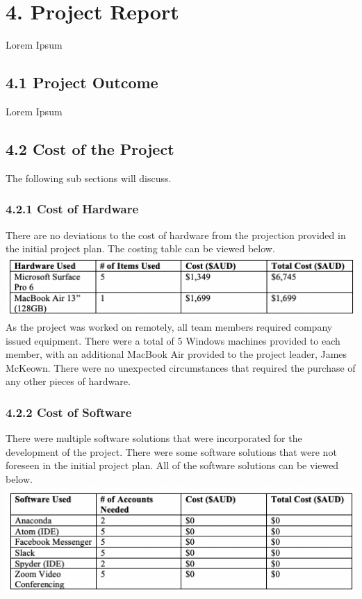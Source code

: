 \documentclass[11pt]{article}
\begin{document}

\section{4. Project Report}
Lorem Ipsum

\subsection{4.1 Project Outcome}
Lorem Ipsum

\subsection{4.2 Cost of the Project}
The following sub sections will discuss.

\subsubsection{4.2.1 Cost of Hardware}
There are no deviations to the cost of hardware from the projection provided in the initial project plan. The costing table can be viewed below. \\

\includegraphics[scale=0.71]{hardware_table.png} \\


As the project was worked on remotely, all team members required company issued equipment. There were a total of 5 Windows machines provided to each member, with an additional MacBook Air provided to the project leader, James McKeown. There were no unexpected circumstances that required the purchase of any other pieces of hardware.

\subsubsection{4.2.2 Cost of Software}
There were multiple software solutions that were incorporated for the development of the project. There were some software solutions that were not foreseen in the initial project plan. All of the software solutions can be viewed below. \\

\includegraphics[scale=0.71]{software_table.png} \\
\end{document}
